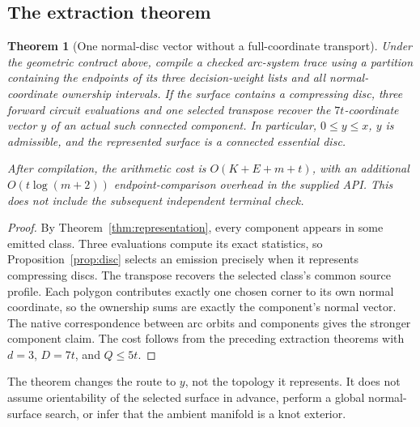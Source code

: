 \documentclass[11pt]{article}
\newtheorem{theorem}{Theorem}[section]
\theoremstyle{definition}\newtheorem{definition}[theorem]{Definition}
\theoremstyle{remark}\newtheorem{remark}[theorem]{Remark}
\begin{document}
\subsection{The extraction theorem}
\begin{theorem}[One normal-disc vector without a full-coordinate transport]
\label{thm:normal}
Under the geometric contract above, compile a checked arc-system trace using a
partition containing the endpoints of its three decision-weight lists and all
normal-coordinate ownership intervals. If the surface contains a compressing
disc, three forward circuit evaluations and one selected transpose recover the
$7t$-coordinate vector $y$ of an actual such connected component. In particular,
$0\le y\le x$, $y$ is admissible, and the represented surface is a connected
essential disc.

After compilation, the arithmetic cost is
$O(K+E+m+t)$, with an additional $O(t\log(m+2))$ endpoint-comparison overhead in
the supplied API. This does not include the subsequent independent terminal
check.
\end{theorem}
\begin{proof}
By Theorem~\ref{thm:representation}, every component appears in some emitted
class. Three evaluations compute its exact statistics, so
Proposition~\ref{prop:disc} selects an emission precisely when it represents
compressing discs. The transpose recovers the selected class's common source
profile. Each polygon contributes exactly one chosen corner to its own normal
coordinate, so the ownership sums are exactly the component's normal vector.
The native correspondence between arc orbits and components gives the stronger
component claim. The cost follows from the preceding extraction theorems with
$d=3$, $D=7t$, and $Q\le5t$.
\end{proof}

The theorem changes the route to $y$, not the topology it represents. It does not
assume orientability of the selected surface in advance, perform a global
normal-surface search, or infer that the ambient manifold is a knot exterior.

\begin{center}
\end{center}
\end{document}
